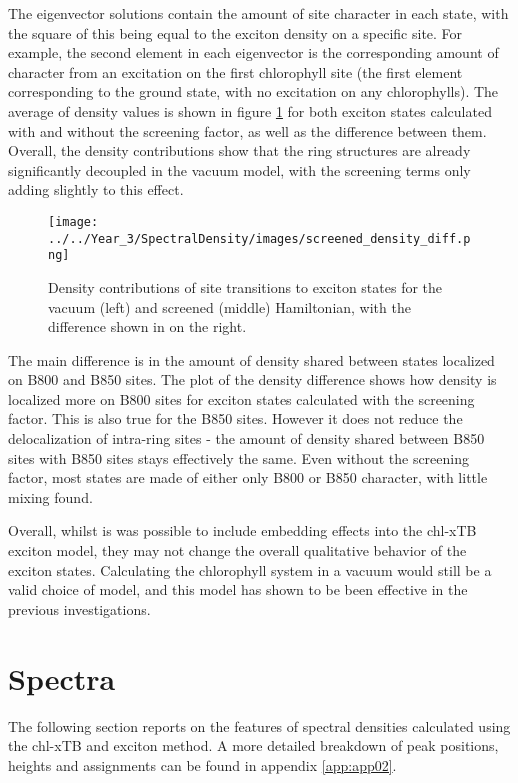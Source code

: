 The eigenvector solutions contain the amount of site character in each state, with
the square of this being equal to the exciton density on a specific site. For example,
the second element in each eigenvector is the corresponding amount of character 
from an excitation on the first chlorophyll site (the first element corresponding
to the ground state, with no excitation on any chlorophylls). The average of density
values is shown in figure \ref{fig:LH2_density} for both exciton states calculated
with and without the screening factor, as well as the difference between them. 
Overall, the density contributions show that the ring structures are already significantly
decoupled in the vacuum model, with the screening terms only adding slightly to 
this effect.

\begin{figure}
    \centering
    \texttt{[image: ../../Year\_3/SpectralDensity/images/screened\_density\_diff.png]}
    \caption{Density contributions of site transitions to exciton states for the
    vacuum (left) and screened (middle) Hamiltonian, with the difference shown in
    on the right.}
    \label{fig:LH2_density}
\end{figure}

The main difference is in the amount of density shared between states localized 
on B800 and B850 sites. The plot of the density difference shows how density is 
localized more on B800 sites for exciton states calculated with the screening
factor. This is also true for the B850 sites. However it does not reduce the delocalization
of intra-ring sites - the amount of density shared between B850 sites with B850 
sites stays effectively the same. Even without the screening factor, most states
are made of either only B800 or B850 character, with little mixing found.

Overall, whilst is was possible to include embedding effects into the chl-xTB exciton
model, they may not change the overall qualitative behavior of the exciton states.
Calculating the chlorophyll system in a vacuum would still be a valid choice of
model, and this model has shown to be been effective in the previous investigations.

\section{Spectra}
\label{sec:sites_states_couplings}

The following section reports on the features of spectral densities calculated using
the chl-xTB and exciton method. A more detailed breakdown of peak positions, heights
and assignments can be found in appendix \ref{app:app02}.

